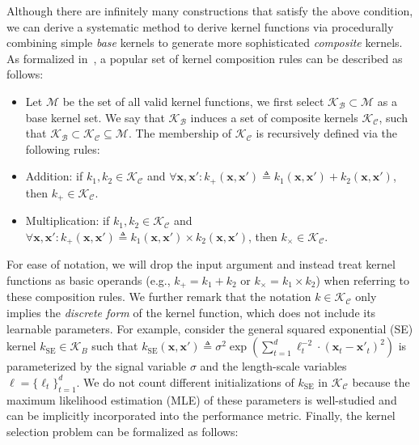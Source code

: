 Although there are infinitely many constructions that satisfy the above condition, we can derive a systematic method to derive kernel functions via procedurally combining simple \emph{base} kernels to generate more sophisticated \emph{composite} kernels. As formalized in~\citet{Duvenaud13}, a popular set of kernel composition rules can be described as follows:
\begin{itemize}
\item Let $\mathcal{M}$ be the set of all valid kernel functions, we first select $\mathcal{K_B} \subset \mathcal{M}$ as a base kernel set. We say that $\mathcal{K_B}$ induces a set of composite kernels $\mathcal{K_C}$, such that $\mathcal{K_B} \subset \mathcal{K_C} \subseteq \mathcal{M}$. The membership of $\mathcal{K_C}$ is recursively defined via the following rules:

\item Addition: if $k_1, k_2 \in \mathcal{K_C}$ and $\forall \mathbf{x,x'}: k_{+}(\mathbf{x}, \mathbf{x}') \triangleq k_1(\mathbf{x}, \mathbf{x}') + k_2(\mathbf{x}, \mathbf{x}')$, then $k_{+} \in \mathcal{K_C}$.

\item Multiplication: if $k_1, k_2 \in \mathcal{K_C}$ and $\forall \mathbf{x,x'}: k_{+}(\mathbf{x}, \mathbf{x}') \triangleq k_1(\mathbf{x}, \mathbf{x}') \times k_2(\mathbf{x}, \mathbf{x}')$, then $k_{\times} \in \mathcal{K_C}$.

\end{itemize}
\noindent For ease of notation, we will drop the input argument and instead treat kernel functions as basic operands (e.g., $k_{+} = k_1 + k_2$ or $k_{\times} = k_1 \times k_2$) when referring to these composition rules. We further remark that the notation $k \in \mathcal{K_C}$ only implies the \emph{discrete form} of the kernel function, which does not include its learnable parameters. For example, consider the general squared exponential (SE) kernel $k_{\mathrm{SE}}\in\mathcal{K}_B$ such that $k_{\mathrm{SE}}(\mathbf{x},\mathbf{x'}) \triangleq \sigma^2\exp\left(\sum_{t=1}^d  \ell_t^{-2}\cdot(\mathbf{x}_t - \mathbf{x'}_t)^2\right)$ is parameterized by the signal variable $\sigma$ and the length-scale variables $\boldsymbol{\ell} = \{\ell_t\}_{t=1}^d$. We do not count different initializations of $k_{\mathrm{SE}}$ in $\mathcal{K_C}$ because the maximum likelihood estimation (MLE) of these parameters is well-studied and can be implicitly incorporated into the performance metric. Finally, the kernel selection problem can be formalized as follows:

